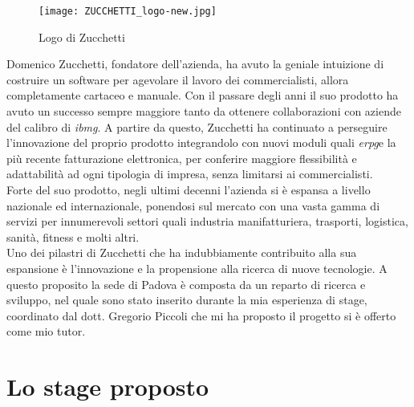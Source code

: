 \begin{figure}[htbp]
	\begin{center}
		\texttt{[image: ZUCCHETTI\_logo-new.jpg]}
		\caption{Logo di Zucchetti}
	\end{center}
\end{figure}

Domenico Zucchetti, fondatore dell'azienda, ha avuto la geniale intuizione di costruire un software per agevolare il lavoro dei commercialisti, allora completamente cartaceo e manuale. Con il passare degli anni il suo prodotto ha avuto un successo sempre maggiore tanto da ottenere collaborazioni con aziende del calibro di \emph{\gls{ibmg}}\glsfirstoccur. A partire da questo, Zucchetti ha continuato a perseguire l'innovazione del proprio prodotto integrandolo con nuovi moduli quali \emph{\gls{erpg}}\glsfirstoccur e la più recente fatturazione elettronica, per conferire maggiore flessibilità e adattabilità ad ogni tipologia di impresa, senza limitarsi ai commercialisti. \\
Forte del suo prodotto, negli ultimi decenni l'azienda si è espansa a livello nazionale ed internazionale, ponendosi sul mercato con una vasta gamma di servizi per innumerevoli settori quali industria manifatturiera, trasporti, logistica, sanità, fitness e molti altri. \\
Uno dei pilastri di Zucchetti che ha indubbiamente contribuito alla sua espansione è l'innovazione e la propensione alla ricerca di nuove tecnologie. A questo proposito la sede di Padova è composta da un reparto di ricerca e sviluppo, nel quale sono stato inserito durante la mia esperienza di stage, coordinato dal dott. Gregorio Piccoli che mi ha proposto il progetto si è offerto come mio tutor.
\section{Lo stage proposto}

